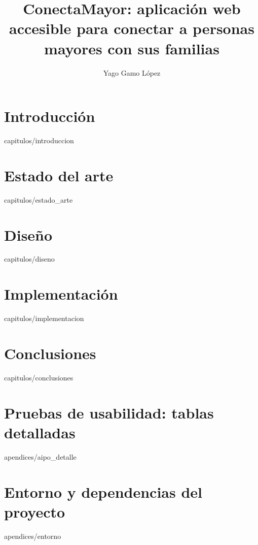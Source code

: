 \documentclass[epsbased,copyright,final,printable,covers,extendedindex,lof,lot,loc,firstnumbered,tfg]{tfgtfmthesisuam}
\title{ConectaMayor: aplicación web accesible para conectar a personas mayores con sus familias}
\author{Yago Gamo López}
\begin{document}

\chapter{Introducción\label{CAP:INTRODUCCION}}{capitulos/introduccion}

\chapter{Estado del arte\label{CAP:ESTADOARTE}}{capitulos/estado_arte}

\chapter{Diseño\label{CAP:DISENO}}{capitulos/diseno}


\chapter{Implementación\label{CAP:IMPLEMENTACION}}{capitulos/implementacion}

\chapter{Conclusiones\label{CAP:CONCLUSIONES}}{capitulos/conclusiones}


\appendix

\chapter{Pruebas de usabilidad: tablas detalladas\label{APP:AIPO}}{apendices/aipo_detalle}

\chapter{Entorno y dependencias del proyecto\label{APP:ENTORNO}}{apendices/entorno}


\end{document}

